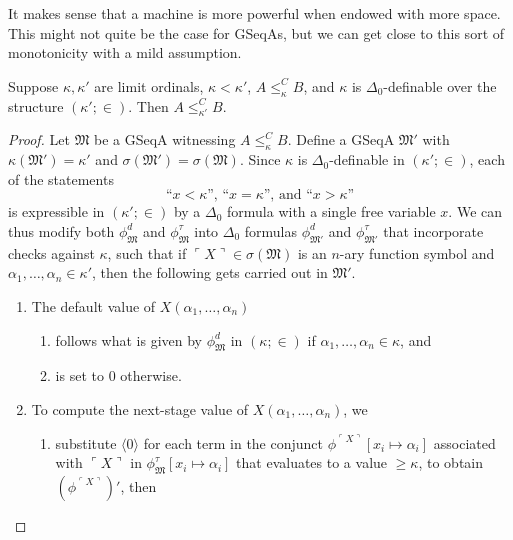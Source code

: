 \documentclass[12pt]{article}
\numberwithin{equation}{section}
\begin{document}
It makes sense that a machine is more powerful when endowed with more space. This might not quite be the case for GSeqAs, but we can get close to this sort of monotonicity with a mild assumption.

\begin{prop}\label{prop246}
Suppose $\kappa, \kappa'$ are limit ordinals, $\kappa < \kappa'$, $A \leq^C_{\kappa} B$, and $\kappa$ is $\Delta_0$-definable over the structure $(\kappa'; \in)$. Then $A \leq^C_{\kappa'} B$.
\end{prop}

\begin{proof}
Let $\mathfrak{M}$ be a GSeqA witnessing $A \leq^C_{\kappa} B$. Define a GSeqA $\mathfrak{M}'$ with $\kappa(\mathfrak{M}') = \kappa'$ and $\sigma(\mathfrak{M}') = \sigma(\mathfrak{M})$. Since $\kappa$ is $\Delta_0$-definable in $(\kappa'; \in)$, each of the statements
\begin{equation*}
    \text{``} x < \kappa \text{'', ``} x = \kappa \text{'', and ``} x > \kappa \text{''}
\end{equation*}
is expressible in $(\kappa'; \in)$ by a $\Delta_0$ formula with a single free variable $x$. We can thus modify both $\phi^d_{\mathfrak{M}}$ and $\phi^{\tau}_{\mathfrak{M}}$ into $\Delta_0$ formulas $\phi^d_{\mathfrak{M}'}$ and $\phi^{\tau}_{\mathfrak{M}'}$ that incorporate checks against $\kappa$, such that if $\ulcorner X \urcorner \in \sigma(\mathfrak{M})$ is an $n$-ary function symbol and $\alpha_1, \dots, \alpha_n \in \kappa'$, then the following gets carried out in $\mathfrak{M}'$.
\begin{enumerate}[label=(\arabic*)]
    \item The default value of $X(\alpha_1, \dots, \alpha_n)$
    \begin{enumerate}[label=(\alph*)]
        \item follows what is given by $\phi^d_{\mathfrak{M}}$ in $(\kappa; \in)$ if $\alpha_1, \dots, \alpha_n \in \kappa$, and
        \item is set to $0$ otherwise.
    \end{enumerate}
    \item\label{8362} To compute the next-stage value of $X(\alpha_1, \dots, \alpha_n)$, we
    \begin{enumerate}[label=(\alph*)]
        \item\label{8362a} substitute $\langle 0 \rangle$ for each term in the conjunct $\phi^{\ulcorner X \urcorner}[x_i \mapsto \alpha_i]$ associated with $\ulcorner X \urcorner$ in $\phi^{\tau}_{\mathfrak{M}}[x_i \mapsto \alpha_i]$ that evaluates to a value $\geq \kappa$, to obtain $(\phi^{\ulcorner X \urcorner})'$, then

\end{enumerate}
\end{enumerate}
\end{proof}
\end{document}
